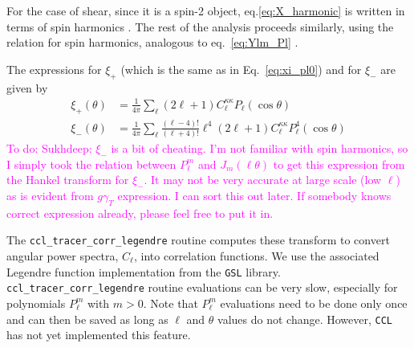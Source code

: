 \documentclass[\docopts]{\docclass}
\newcommand{\todo}[1]{\textcolor{magenta}{To do: #1}}
\begin{document}
For the case of shear, since it is a spin-2 object, eq.\ref{eq:X_harmonic} is written in terms of spin harmonics 
\citep[see for ex.][]{Castro2005,Kilbinger2017}. The rest of the analysis proceeds similarly, using the relation for spin 
harmonics, analogous to eq.~\ref{eq:Ylm_Pl} \citep[see for ex. ][]{Hu1997}. 

The expressions for $\xi_+$ (which is the same as in Eq.~\ref{eq:xi_pl0}) and for $\xi_-$ are given by
\begin{align}
  \xi_+(\theta)&=\frac{1}{4\pi}\sum_{\ell}{(2\ell+1)}C_{\ell}^{\kappa\kappa}
  P_{\ell}(\cos\theta)\label{eq:xi_p}\\
  \xi_-(\theta)&=\frac{1}{4\pi}\sum_{\ell}\frac{(\ell-4)!}{(\ell+4)!}\ell^4{(2\ell+1)}C_{\ell}^{\kappa\kappa}
  P_{\ell}^4(\cos\theta)\label{eq:xi_m}
\end{align}
\todo{Sukhdeep: $\xi_-$ is a bit of cheating. I'm not familiar with spin harmonics, so I simply took the relation between $P_\ell^m$ and $J_m(\ell \theta)$ to get this expression from the Hankel transform for $\xi_-$. It may not be very accurate at large scale (low $\ell$) as is evident from $g\gamma_T$ expression. I can sort this out later. If somebody knows correct expression already, please feel free to put it in.}

The {\tt ccl\_tracer\_corr\_legendre} routine computes these transform to convert angular power spectra, $C_\ell$, into correlation functions. We use the associated Legendre function implementation from the {\tt GSL} library. {\tt ccl\_tracer\_corr\_legendre} routine evaluations can be very slow, especially for polynomials $P_\ell^m$ with $m>0$. Note that $P_\ell^m$ evaluations need to be done only once and can then be saved as long as $\ell$ and $\theta$ values do not change. However, {\tt CCL} has not yet implemented this feature.
\end{document}
